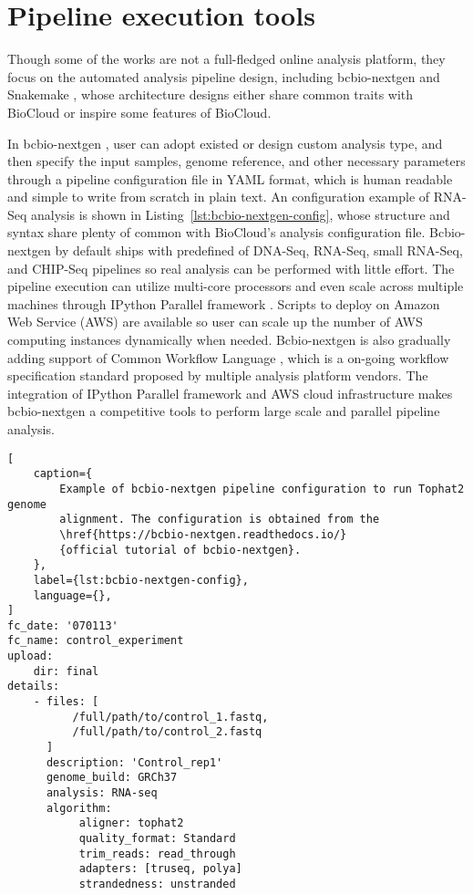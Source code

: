 \section{Pipeline execution tools}
\label{s:pipeline-execution-tool}

Though some of the works are not a full-fledged online analysis platform, they
focus on the automated analysis pipeline design, including bcbio-nextgen
\cite{:bcbionextgen,guimera2012:bcbionextgen} and Snakemake
\cite{koster2012:snakemakea}, whose architecture designs either share common
traits with BioCloud or inspire some features of BioCloud.

In bcbio-nextgen \cite{:bcbionextgen,guimera2012:bcbionextgen}, user can adopt
existed or design custom analysis type, and then specify the input samples,
genome reference, and other necessary parameters through a pipeline
configuration file in YAML format, which is human readable and simple to write
from scratch in plain text. An configuration example of RNA-Seq analysis is
shown in Listing~\ref{lst:bcbio-nextgen-config}, whose structure and syntax
share plenty of common with BioCloud's analysis configuration file.
Bcbio-nextgen by default ships with predefined of DNA-Seq, RNA-Seq, small
RNA-Seq, and CHIP-Seq pipelines so real analysis can be performed with little
effort. The pipeline execution can utilize multi-core processors and even scale
across multiple machines through IPython Parallel framework
\cite{:ipython-parallel}. Scripts to deploy on Amazon Web Service (AWS) are
available so user can scale up the number of AWS computing instances
dynamically when needed. Bcbio-nextgen is also gradually adding support of
Common Workflow Language \cite{amstutz2016:common}, which is a on-going
workflow specification standard proposed by multiple analysis platform vendors.
The integration of IPython Parallel framework and AWS cloud infrastructure
makes bcbio-nextgen a competitive tools to perform large scale and parallel
pipeline analysis.

\begin{lstlisting}[
    caption={
        Example of bcbio-nextgen pipeline configuration to run Tophat2 genome
        alignment. The configuration is obtained from the
        \href{https://bcbio-nextgen.readthedocs.io/}
        {official tutorial of bcbio-nextgen}.
    },
    label={lst:bcbio-nextgen-config},
    language={},
]
fc_date: '070113'
fc_name: control_experiment
upload:
    dir: final
details:
    - files: [
          /full/path/to/control_1.fastq,
          /full/path/to/control_2.fastq
      ]
      description: 'Control_rep1'
      genome_build: GRCh37
      analysis: RNA-seq
      algorithm:
           aligner: tophat2
           quality_format: Standard
           trim_reads: read_through
           adapters: [truseq, polya]
           strandedness: unstranded
\end{lstlisting}

